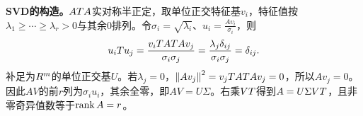 \textbf{SVD的构造。}$AT A$实对称半正定，取单位正交特征基$v_i$，特征值按$\lambda_1\ge\cdots\ge\lambda_r>0$与其余0排列。令$\sigma_i=\sqrt{\lambda_i}$、$u_i=\frac{Av_i}{\sigma_i}$，则
\[u_iT u_j=\dfrac{v_iT AT Av_j}{\sigma_i\sigma_j}=\dfrac{\lambda_j\delta_{ij}}{\sigma_i\sigma_j}=\delta_{ij}.\]
补足为$R^m$的单位正交基$U$。若$\lambda_j=0$，$\left\lVert Av_j\right\rVert^2=v_jT AT Av_j=0$，所以$Av_j=0$。因此$AV$的前$r$列为$\sigma_i u_i$，其余全零，即$AV=U\Sigma$。右乘$VT$得到$A=U\Sigma VT$，且非零奇异值数等于$\operatorname{rank} A=r$。

